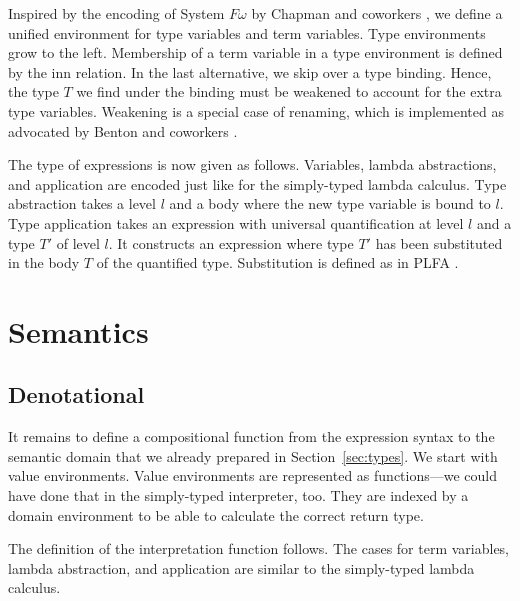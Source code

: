 \documentclass[acmsmall,anonymous,review,screen]{acmart}
\begin{document}
Inspired by the encoding of System $F\omega$ by Chapman and coworkers
\cite{DBLP:conf/mpc/ChapmanKNW19}, we define a 
unified environment for type variables and term variables. Type
environments grow to the left.
\TFTVEnv
Membership of a term variable in a type environment is defined by the
inn relation.
\TFinn
In the last alternative, we skip over a type binding. Hence, the type
$T$ we find under the binding must be weakened to account for the
extra type variables. Weakening is a special case of renaming, which
is implemented as advocated by Benton and coworkers \cite{DBLP:journals/jar/BentonHKM12}.

The type of expressions is now given as follows.
\TFExpr
Variables, lambda abstractions, and application are encoded just like
for the simply-typed lambda calculus.
Type abstraction takes a level $l$ and a body where the new type
variable is bound to $l$. 
Type application takes an expression with universal quantification at
level $l$ and a type $T'$ of level $l$. It constructs an expression
where type $T'$ has been substituted in the body $T$ of the
quantified type. Substitution is defined as in PLFA
\cite{DBLP:journals/jar/BentonHKM12,DBLP:journals/scp/KokkeSW20}. 

\section{Semantics}
\label{sec:semantics}

\subsection{Denotational}
\label{sec:denotational}



It remains to define a compositional function from the expression
syntax to the semantic domain that we already prepared in
Section~\ref{sec:types}. We start with value environments.
\TFVEnv
Value environments are represented as functions---we could have done
that in the simply-typed interpreter, too. They are indexed by a
domain environment to be able to calculate the correct return type.

The definition of the interpretation function follows.
\TFExprSem
The cases for term variables, lambda abstraction, and application are
similar to the  simply-typed lambda calculus.
\end{document}
